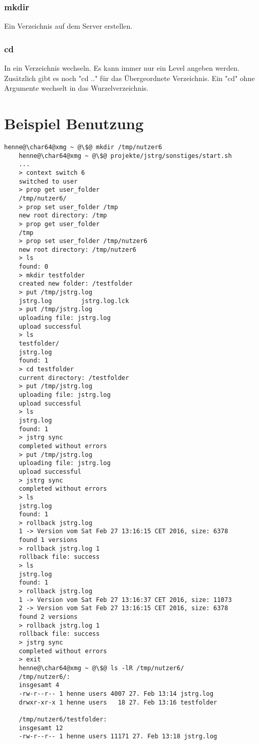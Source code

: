 \documentclass
[   oneside,         %
    12pt,            %
    DIV15,           %
    headsepline,     %
    footsepline,     %
    openright,       %
    a4paper,         %
    abstracton,      %
    titlepage,       %
    headinclude,     %
]   {scrreprt}       %
\begin{document}
	\subsubsection{mkdir}
	Ein Verzeichnis auf dem Server erstellen.
	\subsubsection{cd}
	In ein Verzeichnis wechseln. Es kann immer nur ein Level angeben werden. Zusätzlich gibt es noch "cd .." für das Übergeordnete Verzeichnis. Ein "cd" ohne Argumente wechselt in das Wurzelverzeichnis.
	\newpage{}
	\section{Beispiel Benutzung}
	\begin{lstlisting}[otherkeywords={>}, deletekeywords={set,cd,exit}]
	henne@\char64@xmg ~ @\$@ mkdir /tmp/nutzer6
	henne@\char64@xmg ~ @\$@ projekte/jstrg/sonstiges/start.sh
	...
	> context switch 6
	switched to user
	> prop get user_folder
	/tmp/nutzer6/
	> prop set user_folder /tmp
	new root directory: /tmp
	> prop get user_folder
	/tmp
	> prop set user_folder /tmp/nutzer6
	new root directory: /tmp/nutzer6
	> ls
	found: 0
	> mkdir testfolder
	created new folder: /testfolder
	> put /tmp/jstrg.log
	jstrg.log        jstrg.log.lck
	> put /tmp/jstrg.log
	uploading file: jstrg.log
	upload successful
	> ls
	testfolder/
	jstrg.log
	found: 1
	> cd testfolder
	current directory: /testfolder
	> put /tmp/jstrg.log
	uploading file: jstrg.log
	upload successful
	> ls
	jstrg.log
	found: 1
	> jstrg sync
	completed without errors
	> put /tmp/jstrg.log
	uploading file: jstrg.log
	upload successful
	> jstrg sync
	completed without errors
	> ls
	jstrg.log
	found: 1
	> rollback jstrg.log
	1 -> Version vom Sat Feb 27 13:16:15 CET 2016, size: 6378
	found 1 versions
	> rollback jstrg.log 1
	rollback file: success
	> ls
	jstrg.log
	found: 1
	> rollback jstrg.log
	1 -> Version vom Sat Feb 27 13:16:37 CET 2016, size: 11073
	2 -> Version vom Sat Feb 27 13:16:15 CET 2016, size: 6378
	found 2 versions
	> rollback jstrg.log 1
	rollback file: success
	> jstrg sync
	completed without errors
	> exit
	henne@\char64@xmg ~ @\$@ ls -lR /tmp/nutzer6/
	/tmp/nutzer6/:
	insgesamt 4
	-rw-r--r-- 1 henne users 4007 27. Feb 13:14 jstrg.log
	drwxr-xr-x 1 henne users   18 27. Feb 13:16 testfolder
	
	/tmp/nutzer6/testfolder:
	insgesamt 12
	-rw-r--r-- 1 henne users 11171 27. Feb 13:18 jstrg.log
	\end{lstlisting}
	
	
\end{document}
